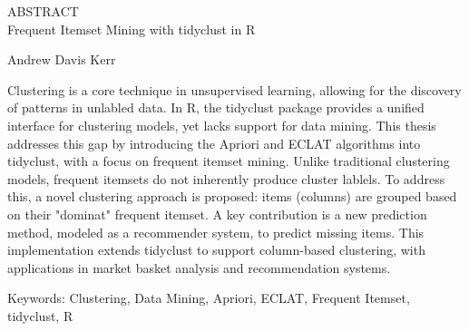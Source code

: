 \begin{center}
ABSTRACT \\
Frequent Itemset Mining with tidyclust in R

Andrew Davis Kerr
\end{center}

Clustering is a core technique in unsupervised learning, allowing for the 
discovery of patterns in unlabled data. In R, the tidyclust package provides a 
unified interface for clustering models, yet lacks support for data mining. This 
thesis addresses this gap by introducing the Apriori and ECLAT algorithms into 
tidyclust, with a focus on frequent itemset mining. Unlike traditional 
clustering models, frequent itemsets do not inherently produce cluster lablels. 
To address this, a novel clustering approach is proposed: items (columns) are 
grouped based on their "dominat" frequent itemset. A key contribution is a new
prediction method, modeled as a recommender system, to predict missing items. 
This implementation extends tidyclust to support column-based clustering, with 
applications in market basket analysis and recommendation systems.

Keywords: Clustering, Data Mining, Apriori, ECLAT, Frequent Itemset, tidyclust, R
\clearpage